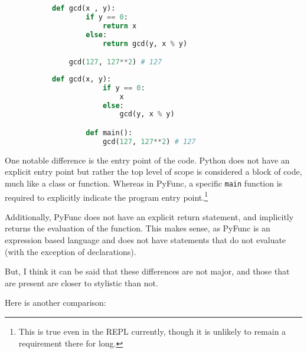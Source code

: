 \documentclass{l4proj}
\begin{document}
\begin{figure}[H]
\begin{subfigure}{0.45\textwidth}
    \begin{lstlisting}[language=Python, label=lst:python-gcd, caption=Python greatest common divisor program.]
    def gcd(x , y):
        if y == 0:
            return x
        else:
            return gcd(y, x % y)

    gcd(127, 127**2) # 127
    \end{lstlisting}
\end{subfigure}
\hfill
\begin{subfigure}{0.45\textwidth}
    \begin{lstlisting}[language=Python, label=lst:pyfunc-gcd, caption=Pyfunc greatest common divisor example program.]
        def gcd(x, y):
            if y == 0:
                x
            else:
                gcd(y, x % y)

        def main():
            gcd(127, 127**2) # 127
    \end{lstlisting}
\end{subfigure}
\end{figure}

One notable difference is the entry point of the code.
Python does not have an explicit entry point but rather the top level of scope is considered a block of code, much like a class or function\cite{Python_documentation}.
Whereas in PyFunc, a specific \texttt{main} function is required to explicitly indicate the program entry point.\footnote{This is true even in the REPL currently, though it is unlikely to remain a requirement there for long.}

Additionally, PyFunc does not have an explicit return statement, and implicitly returns the evaluation of the function.
This makes sense, as PyFunc is an expression based language and does not have statements that do not evaluate (with the exception of declarations).

But, I think it can be said that these differences are not major, and those that are present are closer to stylistic than not.

Here is another comparison:
\end{document}
